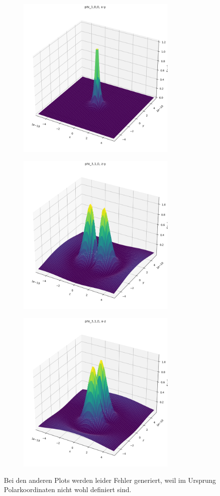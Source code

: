 \documentclass[ex, minted]{exercise_4.0}
\begin{document}
\begin{figure}[H]
    \centering
    \includegraphics[width=0.7\textwidth]{1.3.png}
\end{figure}

\begin{figure}[H]
    \centering
    \includegraphics[width=0.7\textwidth]{3.1.png}
\end{figure}

\begin{figure}[H]
    \centering
    \includegraphics[width=0.7\textwidth]{3.2.png}
\end{figure}

Bei den anderen Plots werden leider Fehler generiert, weil im Ursprung Polarkoordinaten nicht wohl definiert sind.
\end{document}
